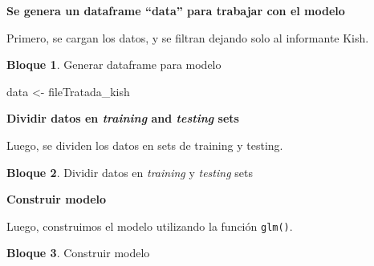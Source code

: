 \documentclass[]{book}
\newenvironment{Shaded}{\begin{snugshade}}{\end{snugshade}}
\newcommand{\DecValTok}[1]{\textcolor[rgb]{0.00,0.00,0.81}{#1}}
\newcommand{\KeywordTok}[1]{\textcolor[rgb]{0.13,0.29,0.53}{\textbf{#1}}}
\newcommand{\NormalTok}[1]{#1}
\newcommand{\OperatorTok}[1]{\textcolor[rgb]{0.81,0.36,0.00}{\textbf{#1}}}
\newcommand{\StringTok}[1]{\textcolor[rgb]{0.31,0.60,0.02}{#1}}
\theoremstyle{definition}
\theoremstyle{definition}
\newtheorem{example}{Bloque}[chapter]
\theoremstyle{definition}
\theoremstyle{definition}
\theoremstyle{remark}
\begin{document}
\textbf{Se genera un dataframe ``data'' para trabajar con el modelo}

Primero, se cargan los datos, y se filtran dejando solo al informante Kish.

\begin{example}
\protect\hypertarget{exm:bloque80nbm}{}{\label{exm:bloque80nbm} }Generar dataframe para modelo
\end{example}

\begin{Shaded}
\begin{Highlighting}[]
\NormalTok{data <-}\StringTok{ }\NormalTok{fileTratada_kish}
\end{Highlighting}
\end{Shaded}

\textbf{Dividir datos en \emph{training} and \emph{testing} sets}

Luego, se dividen los datos en sets de training y testing.

\begin{example}
\protect\hypertarget{exm:bloque81nbm}{}{\label{exm:bloque81nbm} }Dividir datos en \emph{training} y \emph{testing} sets
\end{example}

\begin{Shaded}
\end{Shaded}

\textbf{Construir modelo}

Luego, construimos el modelo utilizando la función \texttt{glm()}.

\begin{example}
\protect\hypertarget{exm:bloque82nbm}{}{\label{exm:bloque82nbm} }Construir modelo
\end{example}
\end{document}
